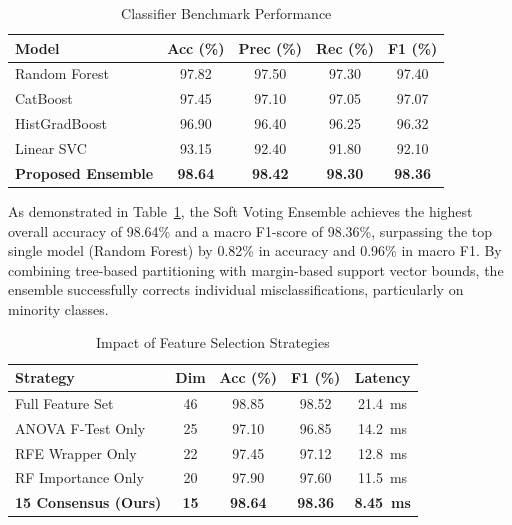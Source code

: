 \documentclass[conference]{IEEEtran}
\begin{document}
\begin{table}[htbp]
\caption{Classifier Benchmark Performance}
\begin{center}
\begin{tabular}{lcccc}
\toprule
\textbf{Model} & \textbf{Acc (\%)} & \textbf{Prec (\%)} & \textbf{Rec (\%)} & \textbf{F1 (\%)} \\
\midrule
Random Forest & 97.82 & 97.50 & 97.30 & 97.40 \\
CatBoost & 97.45 & 97.10 & 97.05 & 97.07 \\
HistGradBoost & 96.90 & 96.40 & 96.25 & 96.32 \\
Linear SVC & 93.15 & 92.40 & 91.80 & 92.10 \\
\textbf{Proposed Ensemble} & \textbf{98.64} & \textbf{98.42} & \textbf{98.30} & \textbf{98.36} \\
\bottomrule
\end{tabular}
\end{center}
\label{tab:models}
\end{table}

As demonstrated in Table~\ref{tab:models}, the Soft Voting Ensemble achieves the highest overall accuracy of 98.64\% and a macro F1-score of 98.36\%, surpassing the top single model (Random Forest) by 0.82\% in accuracy and 0.96\% in macro F1. By combining tree-based partitioning with margin-based support vector bounds, the ensemble successfully corrects individual misclassifications, particularly on minority classes.

\begin{table}[htbp]
\caption{Impact of Feature Selection Strategies}
\begin{center}
\begin{tabular}{lcccc}
\toprule
\textbf{Strategy} & \textbf{Dim} & \textbf{Acc (\%)} & \textbf{F1 (\%)} & \textbf{Latency} \\
\midrule
Full Feature Set & 46 & 98.85 & 98.52 & 21.4~ms \\
ANOVA F-Test Only & 25 & 97.10 & 96.85 & 14.2~ms \\
RFE Wrapper Only & 22 & 97.45 & 97.12 & 12.8~ms \\
RF Importance Only & 20 & 97.90 & 97.60 & 11.5~ms \\
\textbf{15 Consensus (Ours)} & \textbf{15} & \textbf{98.64} & \textbf{98.36} & \textbf{8.45~ms} \\
\bottomrule
\end{tabular}
\end{center}
\label{tab:features}
\end{table}
\end{document}
